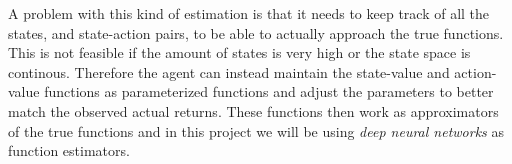 \documentclass[11pt]{article}
\begin{document}
A problem with this kind of estimation is that it needs to keep track of all the states, and state-action
pairs, to be able to actually approach the true functions.
This is not feasible if the amount of states is very high or the state space is continous.
Therefore the agent can instead maintain the state-value and action-value functions as
parameterized functions and adjust the parameters to better match the observed actual returns\cite{RLBook}.
These functions then work as approximators of the true functions and in this project we will
be using \textit{deep neural networks} as function estimators.



%
%
\end{document}
